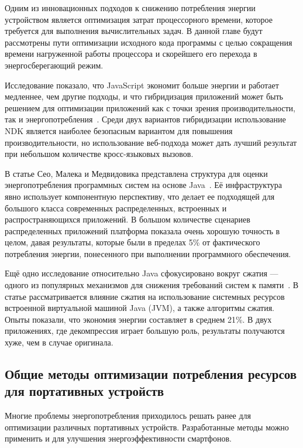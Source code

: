 \documentclass[a4paper,14pt]{extarticle} %
\begin{document}
	Одним из инновационных подходов к снижению потребления энергии устройством является оптимизация затрат процессорного времени, которое требуется для выполнения вычислительных задач. В данной главе будут рассмотрены пути оптимизации исходного кода программы с целью сокращения времени нагруженной работы процессора и скорейшего его перехода в энергосберегающий режим.
	
	Исследование показало, что JavaScript экономит больше энергии и работает медленнее, чем другие подходы, и что гибридизация приложений может быть решением для оптимизации приложений как с точки зрения производительности, так и энергопотребления~\parencite{oliveira2017study}. Среди двух вариантов гибридизации использование NDK является наиболее безопасным вариантом для повышения производительности, но использование веб-подхода может дать лучший результат при небольшом количестве кросс-языковых вызовов.
	
	В статье Сео, Малека и Медвидовика представлена структура для оценки энергопотребления программных систем на основе Java~\parencite{seo2007energy}. Её инфраструктура явно использует компонентную перспективу, что делает ее подходящей для большого класса современных распределенных, встроенных и распространяющихся приложений. В большом количестве сценариев распределенных приложений платформа показала очень хорошую точность в целом, давая результаты, которые были в пределах 5\% от фактического потребления энергии, понесенного при выполнении программного обеспечения. 
	
	Ещё одно исследование относительно Java сфокусировано вокруг сжатия --- одного из популярных механизмов для снижения требований систем к памяти~\parencite{гуанджиу2004экономия}. В статье рассматривается влияние сжатия на использование системных ресурсов встроенной виртуальной машиной Java (JVM), а также алгоритмы сжатия. Опыты показали, что экономия энергии составляет в среднем 21\%. В двух приложениях, где декомпрессия играет большую роль, результаты получаются хуже, чем в случае оригинала.
	
	\subsection{Общие  методы оптимизации потребления ресурсов для портативных устройств}
	
	Многие проблемы энергопотребления приходилось решать ранее для оптимизации различных портативных устройств. Разработанные методы можно применить и для улучшения энергоэффективности смартфонов. 
	
\end{document}
